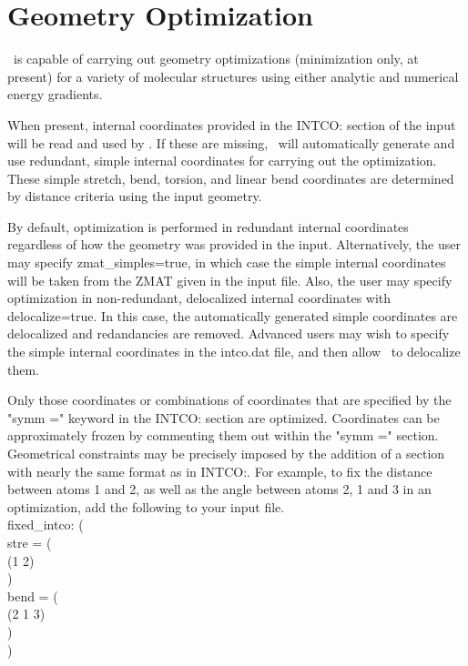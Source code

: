 \section{Geometry Optimization} \label{sec:opt}

\PSIthree\ is capable of carrying out geometry optimizations (minimization
only, at present) for a variety of molecular structures using either analytic
and numerical energy gradients.  

When present, internal coordinates provided in the INTCO: section of the
input will be read and used by \PSIthree.  If these are missing, \PSIthree\
will automatically generate and use redundant, simple internal
coordinates for carrying out the optimization.  These simple stretch, bend,
torsion, and linear bend coordinates are determined by distance
criteria using the input geometry.

By default, optimization is performed in redundant internal coordinates
regardless of how the geometry was provided in the input.  Alternatively,
the user may specify zmat\_simples=true, in which case the simple internal
coordinates will be taken from the ZMAT given in the input file.  Also,
the user may specify optimization in non-redundant, delocalized internal coordinates
with delocalize=true.  In this case, the automatically generated simple
coordinates are delocalized and redandancies are removed.  Advanced users
may wish to specify the simple internal coordinates in the intco.dat file, and
then allow \PSIthree\ to delocalize them.

Only those coordinates or combinations of coordinates that are specified
by the "symm =" keyword in the INTCO: section are optimized.  Coordinates can
be approximately frozen by commenting them out within the "symm =" section.
Geometrical constraints may be precisely imposed by the addition of a section
with nearly the same format as in INTCO:.  For example, to fix the distance
between atoms 1 and 2, as well as the angle between atoms 2, 1 and 3
in an optimization, add the following to your input file.
\\
\noindent
fixed\_intco: ( \\
  stre = ( \\
    (1 2) \\
  ) \\
  bend = ( \\
    (2 1 3) \\
  ) \\
) \\

